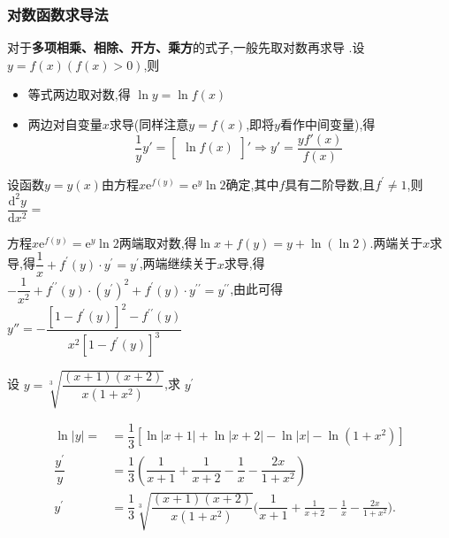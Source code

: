 \documentclass[8pt a4paper, oneside, UTF8]{ctexbook}  %
\begin{document}
\begin{sloppypar}
    \subsubsection{对数函数求导法}
    对于\textbf{多项相乘、相除、开方、乘方}的式子,一般先取对数再求导 .设$y=f(x)(f(x)>0)$,则
    \begin{itemize}
        \item 等式两边取对数,得 $\ln y=\ln f(x)$
        \item 两边对自变量$x$求导(同样注意$y=f(x)$,即将$y$看作中间变量),得
              $$
                  \dfrac{1}{y}y'=\begin{bmatrix}\ln f(x)\end{bmatrix}'\Rightarrow y'=\frac{yf'(x)}{f(x)}\
              $$
    \end{itemize}
    \begin{problem}
    设函数$y=y(x)$由方程$x\mathrm{e}^{f(y)}=\mathrm{e}^y\ln2$确定,其中$f$具有二阶导数,且$f^{\prime}\neq1$,则$\dfrac{\mathrm{d}^2y}{\mathrm{d}x^2}=$
    \end{problem}
    \begin{solution}
        方程$x\mathrm{e}^{f(y)}=\mathrm{e}^{y}\ln2$两端取对数,得$\ln x+f(y)=y+\ln(\ln2).$两端关于$x$求导,得$\dfrac1x+f^{\prime}(y)\cdot y^{\prime}=y^{\prime}$,两端继续关于$x$求导,得$-\dfrac1{x^2}+f^{\prime\prime}(y)\cdot(y^{\prime})^2+f^{\prime}(y)\cdot y^{\prime\prime}=y^{\prime\prime}$,由此可得
        $y''=-\dfrac{[1-f^{\prime}(y)]^{2}-f^{\prime\prime}(y)}{x^{2}[1-f^{\prime}(y)]^{3}}$
    \end{solution}
    \begin{problem}
    设 $y=\sqrt[3]{\dfrac{\left(x+1\right)\left(x+2\right)}{x\left(1+x^{2}\right)}}$,求 $y^\prime$
    \end{problem}
    \begin{solution}
        \begin{align*}
            \ln |y|=              & = \dfrac{1}{3}[\ln| x+1 |+\ln| x+2 |-\ln| x |-\ln(1+x^{2})]                                                                 \\
            \dfrac{y^{\prime}}{y} & =\dfrac{1}{3}\left(\dfrac{1}{x+1}+\dfrac{1}{x+2}-\dfrac{1}{x}-\dfrac{2x}{1+x^{2}}\right)                                    \\
            y^{\prime}            & =\dfrac{1}{3}\sqrt[3]{\dfrac{(x+1)(x+2)}{x(1+x^{2})}}\Big(\dfrac{1}{x+1}+\frac{1}{x+2}-\frac{1}{x}-\frac{2x}{1+x^{2}}\Big).
        \end{align*}
    \end{solution}

\end{sloppypar}
\end{document}
